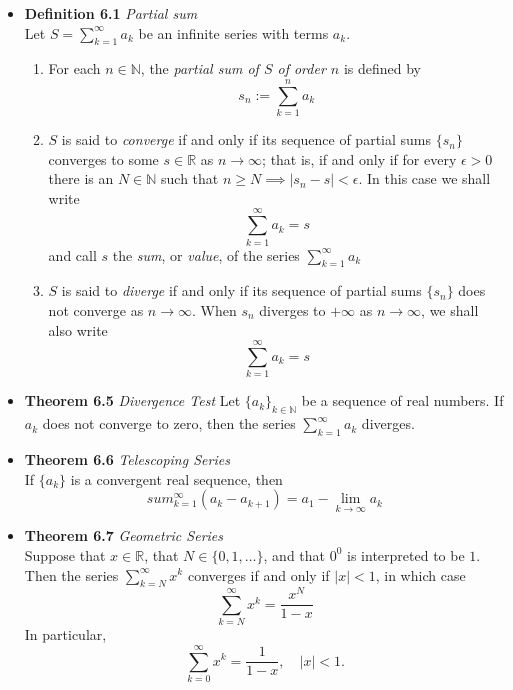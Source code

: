\documentclass[11pt,a4paper]{article}
\begin{document}
\begin{itemize}

    \item \textbf{Definition 6.1} \emph{Partial sum} \\
        Let $S = \sum_{k=1}^\infty a_k$ be an infinite series with terms $a_k$.
        \begin{enumerate}
            \item For each $n \in \mathbb{N}$, the \emph{partial sum of $S$ of order $n$}
                is defined by
                \[
                    s_n := \sum_{k=1}^n a_k
                \]

            \item $S$ is said to \emph{converge} if and only if its sequence of partial sums
                $\{s_n\}$ converges to some $s \in \mathbb{R}$ as $n \to \infty$;
                that is, if and only if for every $\epsilon > 0$ there is an
                $N \in \mathbb{N}$ such that $n \geq N \implies |s_n - s| < \epsilon$.
                In this case we shall write
                \[
                    \sum_{k=1}^\infty a_k = s
                \]
                and call $s$ the \emph{sum}, or \emph{value}, of the series
                $\sum_{k=1}^\infty a_k$

            \item $S$ is said to \emph{diverge} if and only if its sequence of partial sums
                $\{s_n\}$ does not converge as $n \to \infty$.
            When $s_n$ diverges to $+\infty$ as $n \to \infty$, we shall also write
                \[
                    \sum_{k=1}^\infty a_k = s
                \]
        \end{enumerate}

    \item \textbf{Theorem 6.5} \emph{Divergence Test}
        Let ${\{a_k\}}_{k \in \mathbb{N}}$ be a sequence of real numbers.
        If $a_k$ does not converge to zero, then the series $\sum_{k=1}^\infty a_k$ diverges.

    \item \textbf{Theorem 6.6} \emph{Telescoping Series} \\
        If $\{a_k\}$ is a convergent real sequence, then
        \[
            sum_{k=1}^\infty (a_k - a_{k+1}) = a_1 - \lim_{k \to \infty} a_k
        \]

    \item \textbf{Theorem 6.7} \emph{Geometric Series} \\
        Suppose that $x \in \mathbb{R}$, that $N \in \{ 0, 1, \ldots\}$, and that $0^0$
        is interpreted to be $1$.
        Then the series $\sum_{k=N}^\infty x^k$ converges if and only if $|x| < 1$,
        in which case
        \[
            \sum_{k=N}^\infty x^k = \frac{x^N}{1-x}
        \]
        In particular,
        \[
            \sum_{k=0}^\infty x^k = \frac{1}{1-x}, \quad |x| < 1.
        \]


\end{itemize}
\end{document}
